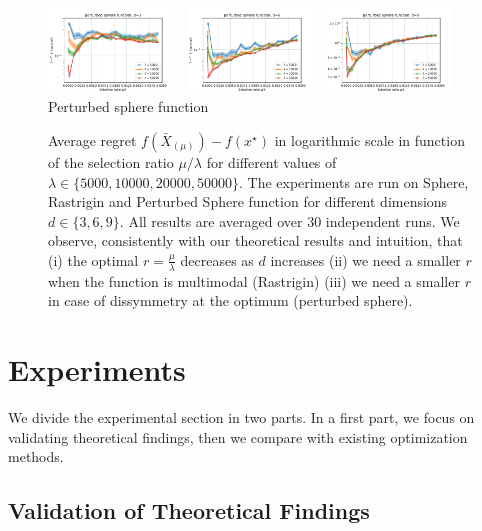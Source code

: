 \begin{figure}[!h]
        \includegraphics[width=0.3\textwidth]{sections/appendix/foga2021-kbest/plots/perturbed_sphere_3.pdf}~  \includegraphics[width=0.3\textwidth]{sections/appendix/foga2021-kbest/plots/perturbed_sphere_6.pdf}~     \includegraphics[width=0.3\textwidth]{sections/appendix/foga2021-kbest/plots/perturbed_sphere_9.pdf}\\ Perturbed sphere function\\
    \caption{Average regret $f(\bar{X}_{(\mu)})-f(x^\star)$ in logarithmic scale in function of the selection ratio $\mu /\lambda$ for different values of $\lambda\in\{5000,10000,20000,50000\}$. The experiments are run on Sphere, Rastrigin and Perturbed Sphere function for different dimensions  $d\in \{3,6,9\}$. All results are averaged over $30$ independent runs. We observe, consistently with our theoretical results and intuition, that (i) the optimal $r=\frac{\mu}{\lambda}$ decreases as $d$ increases (ii) we need a smaller $r$ when the function is multimodal (Rastrigin) (iii) we need a smaller $r$ in case of dissymmetry at the optimum (perturbed sphere).}
    \label{fig:examples}
\end{figure}
\section{Experiments}
\label{sec:xps}
We divide the experimental section in two parts. In a first part, we focus on validating theoretical findings, then we compare with existing optimization methods.

\subsection{Validation of Theoretical Findings}

